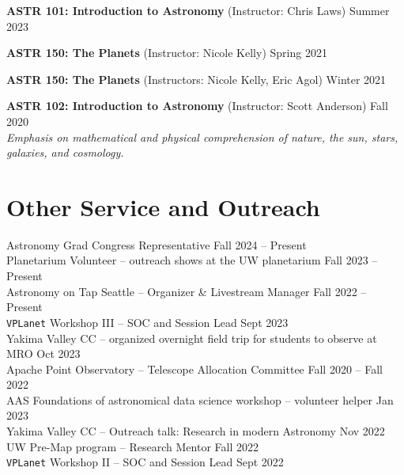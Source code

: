 \documentclass[a4,11pt]{article}
\begin{document}
\textbf{ASTR 101: Introduction to Astronomy} (Instructor: Chris Laws) \hfill Summer 2023  \\
\vspace{.2cm}

\textbf{ASTR 150: The Planets} (Instructor: Nicole Kelly) \hfill Spring 2021  \\
\vspace{.2cm}

\textbf{ASTR 150: The Planets} (Instructors: Nicole Kelly, Eric Agol) \hfill Winter 2021  \\
\vspace{.2cm}

\textbf{ASTR 102: Introduction to Astronomy} (Instructor: Scott Anderson) \hfill Fall 2020 \\
\textsl{Emphasis on mathematical and physical comprehension of nature, the sun, stars, galaxies, and cosmology.}


\section{Other Service and Outreach}

Astronomy Grad Congress Representative \hfill Fall 2024 -- Present \\
Planetarium Volunteer -- outreach shows at the UW planetarium \hfill Fall 2023 -- Present \\
Astronomy on Tap Seattle -- Organizer \& Livestream Manager \hfill Fall 2022 -- Present \\
\texttt{VPLanet} Workshop III -- SOC and Session Lead \hfill Sept 2023 \\
Yakima Valley CC -- organized overnight field trip for students to observe at MRO \hfill Oct 2023 \\
Apache Point Observatory -- Telescope Allocation Committee \hfill Fall 2020 -- Fall 2022 \\
AAS Foundations of astronomical data science workshop -- volunteer helper \hfill Jan 2023 \\
Yakima Valley CC -- Outreach talk: Research in modern Astronomy \hfill Nov 2022 \\
UW Pre-Map program -- Research Mentor \hfill Fall 2022 \\
\texttt{VPLanet} Workshop II -- SOC and Session Lead \hfill Sept 2022 

\end{document}
